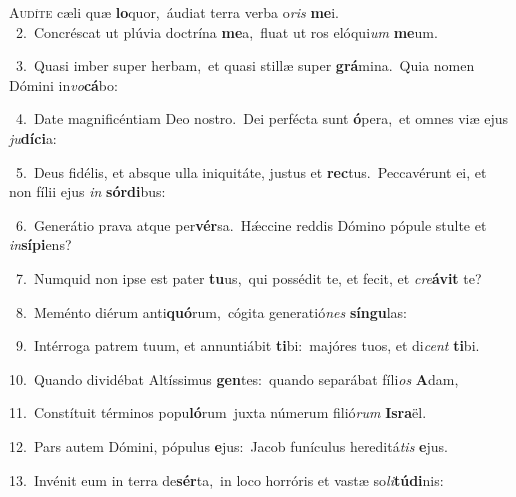 \lettrine{\initial\textcolor{\initialcolor}{A}}{udíte} cæli quæ \textbf{lo}\-quor,~\star áudiat terra verba o\textit{ris} \textbf{me}\-i.\\
{\numbfont\textcolor{\numbcolor}{~2.}}~Concréscat ut plúvia doctrína \textbf{me}\-a,~\star fluat ut ros elóqui\textit{um} \textbf{me}\-um.\par
{\numbfont\textcolor{\numbcolor}{~3.}}~Quasi imber super herbam,~\dagger et quasi stillæ super \textbf{grá}\-mina.~\star Quia nomen Dómini in\-\textit{vo}\-\textbf{cá}bo:\par
{\numbfont\textcolor{\numbcolor}{~4.}}~Date magnificéntiam Deo nostro.~\dagger Dei perfécta sunt \textbf{ó}\-pera,~\star et omnes viæ ejus \textit{ju}\-\textbf{dí}\textbf{ci}a:\par
{\numbfont\textcolor{\numbcolor}{~5.}}~Deus fidélis, et absque ulla iniquitáte, justus et \textbf{rec}\-tus.~\star Peccavérunt ei, et non fílii ejus \textit{in} \textbf{sór}\-\textbf{di}bus:\par
{\numbfont\textcolor{\numbcolor}{~6.}}~Generátio prava atque per\-\textbf{vér}\-sa.~\star Hǽccine reddis Dómino pópule stulte et \textit{in}\-\textbf{sí}\textbf{pi}ens?\par
{\numbfont\textcolor{\numbcolor}{~7.}}~Numquid non ipse est pater \textbf{tu}\-us,~\star qui possédit te, et fecit, et \textit{cre}\-\textbf{á}\textbf{vit} te?\par
{\numbfont\textcolor{\numbcolor}{~8.}}~Meménto diérum anti\-\textbf{quó}\-rum,~\star cógita generatió\textit{nes} \textbf{sín}\-\textbf{gu}las:\par
{\numbfont\textcolor{\numbcolor}{~9.}}~Intérroga patrem tuum, et annuntiábit \textbf{ti}\-bi:~\star majóres tuos, et di\textit{cent} \textbf{ti}\-bi.\par
{\numbfont\textcolor{\numbcolor}{10.}}~Quando dividébat Altíssimus \textbf{gen}\-tes:~\star quando separábat fíli\textit{os} \textbf{A}\-dam,\par
{\numbfont\textcolor{\numbcolor}{11.}}~Constítuit términos popu\-\textbf{ló}\-rum~\star juxta númerum filió\textit{rum} \textbf{Is}\-\textbf{ra}ël.\par
{\numbfont\textcolor{\numbcolor}{12.}}~Pars autem Dómini, pópulus \textbf{e}\-jus:~\star Jacob funículus hereditá\textit{tis} \textbf{e}\-jus.\par
{\numbfont\textcolor{\numbcolor}{13.}}~Invénit eum in terra de\-\textbf{sér}\-ta,~\star in loco horróris et vastæ so\-\textit{li}\-\textbf{tú}\textbf{di}nis:\par
